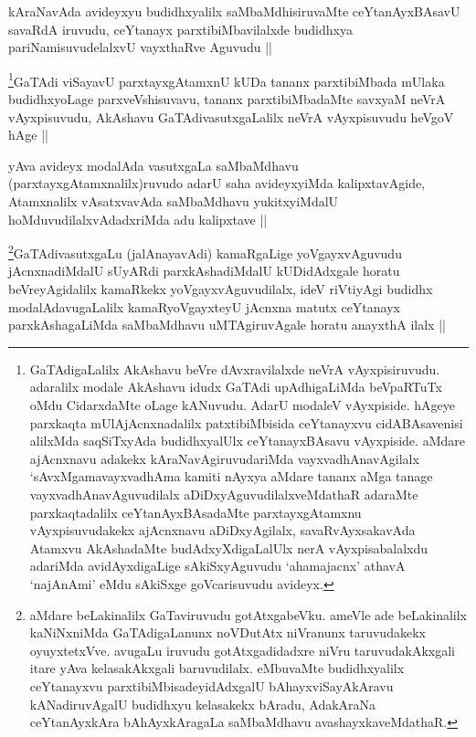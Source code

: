 \begin{artha}
kAraNavAda avideyxyu budidhxyalilx saMbaMdhisiruvaMte ceYtanAyxBAsavU savaRdA iruvudu, ceYtanayx parxtibiMbavilalxde budidhxya pariNamisuvudelalxvU vayxthaRve Aguvudu ||
\end{artha}

\begin{artha}
\footnote{GaTAdigaLalilx AkAshavu beVre dAvxravilalxde neVrA vAyxpisiruvudu. adaralilx modale AkAshavu idudx GaTAdi upAdhigaLiMda beVpaRTuTx oMdu CidarxdaMte oLage kANuvudu. AdarU modaleV vAyxpiside. hAgeye parxkaqta mUlAjAcnxnadalilx patxtibiMbisida ceYtanayxvu cidABAsavenisi alilxMda saqSiTxyAda budidhxyalUlx ceYtanayxBAsavu vAyxpiside. aMdare ajAcnxnavu adakekx kAraNavAgiruvudariMda vayxvadhAnavAgilalx `sAvxMgamavayxvadhAma kamiti nAyxya aMdare tananx aMga tanage vayxvadhAnavAguvudilalx aDiDxyAguvudilalxveMdathaR adaraMte parxkaqtadalilx ceYtanAyxBAsadaMte parxtayxgAtamxnu vAyxpisuvudakekx ajAcnxnavu aDiDxyAgilalx, savaRvAyxsakavAda Atamxvu AkAshadaMte budAdxyXdigaLalUlx nerA vAyxpisabalalxdu adariMda avidAyxdigaLige sAkiSxyAguvudu `ahamajacnx' athavA `najAnAmi' eMdu sAkiSxge goVcarisuvudu avideyx.}GaTAdi viSayavU parxtayxgAtamxnU kUDa tananx parxtibiMbada mUlaka budidhxyoLage parxveVshisuvavu, tananx parxtibiMbadaMte savxyaM neVrA vAyxpisuvudu, AkAshavu GaTAdivasutxgaLalilx neVrA vAyxpisuvudu heVgoV hAge ||
\end{artha}

\begin{artha}
yAva avideyx modalAda vasutxgaLa saMbaMdhavu (parxtayxgAtamxnalilx)ruvudo adarU saha avideyxyiMda kalipxtavAgide, Atamxnalilx vAsatxvavAda saMbaMdhavu yukitxyiMdalU hoMduvudilalxvAdadxriMda adu kalipxtave ||
\end{artha}

\begin{artha}
\footnote{aMdare beLakinalilx GaTaviruvudu gotAtxgabeVku. ameVle ade beLakinalilx kaNiNxniMda GaTAdigaLanunx noVDutAtx niVranunx taruvudakekx oyuyxtetxVve. avugaLu iruvudu gotAtxgadidadxre niVru taruvudakAkxgali itare yAva kelasakAkxgali baruvudilalx. eMbuvaMte budidhxyalilx ceYtanayxvu parxtibiMbisadeyidAdxgalU bAhayxviSayAkAravu kANadiruvAgalU budidhxyu kelasakekx bAradu, AdakAraNa ceYtanAyxkAra bAhAyxkAragaLa saMbaMdhavu avashayxkaveMdathaR.}GaTAdivasutxgaLu (jalAnayavAdi) kamaRgaLige yoVgayxvAguvudu jAcnxnadiMdalU sUyARdi parxkAshadiMdalU kUDidAdxgale horatu beVreyAgidalilx kamaRkekx yoVgayxvAguvudilalx, ideV riVtiyAgi budidhx modalAdavugaLalilx kamaRyoVgayxteyU jAcnxna matutx ceYtanayx parxkAshagaLiMda saMbaMdhavu uMTAgiruvAgale horatu anayxthA ilalx ||
\end{artha}

